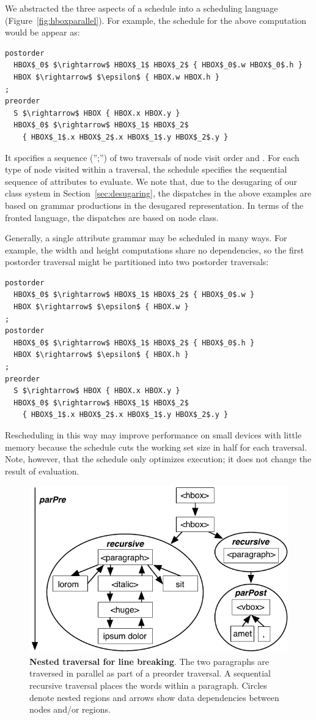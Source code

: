 We abstracted the three aspects of a schedule into a scheduling language (Figure~\ref{fig:hboxparallel}). For example, the schedule for the above computation would be appear as:
\begin{lstlisting}[mathescape,morekeywords={preorder,postorder}]
postorder
  HBOX$_0$ $\rightarrow$ HBOX$_1$ HBOX$_2$ { HBOX$_0$.w HBOX$_0$.h }
  HBOX $\rightarrow$ $\epsilon$ { HBOX.w HBOX.h }
;
preorder
  S $\rightarrow$ HBOX { HBOX.x HBOX.y }
  HBOX$_0$ $\rightarrow$ HBOX$_1$ HBOX$_2$ 
    { HBOX$_1$.x HBOX$_2$.x HBOX$_1$.y HBOX$_2$.y }
\end{lstlisting}
It specifies a sequence ('';'') of two traversals of node visit order  and . For each type of node visited within a traversal, the schedule specifies the sequential sequence of attributes to evaluate. We note that, due to the desugaring of our class system in Section~\ref{sec:desugaring}, the dispatches in the above examples are based on grammar productions in the desugared representation. In terms of the fronted language, the dispatches are based on node class.


Generally, a single attribute grammar may be scheduled in many ways. For example, the width and height computations share no dependencies, so the first postorder traversal might be partitioned into two postorder traversals:
\begin{lstlisting}[mathescape,morekeywords={preorder,postorder}]
postorder
  HBOX$_0$ $\rightarrow$ HBOX$_1$ HBOX$_2$ { HBOX$_0$.w }
  HBOX $\rightarrow$ $\epsilon$ { HBOX.w }
;
postorder
  HBOX$_0$ $\rightarrow$ HBOX$_1$ HBOX$_2$ { HBOX$_0$.h }
  HBOX $\rightarrow$ $\epsilon$ { HBOX.h }
;
preorder
  S $\rightarrow$ HBOX { HBOX.x HBOX.y }
  HBOX$_0$ $\rightarrow$ HBOX$_1$ HBOX$_2$ 
    { HBOX$_1$.x HBOX$_2$.x HBOX$_1$.y HBOX$_2$.y }
\end{lstlisting}
Rescheduling in this way may improve performance on small devices with little memory because the schedule cuts the working set size in half for each traversal. Note, however, that the schedule only optimizes execution; it does not change the result of evaluation.


\begin{figure}
\centering
\includegraphics[trim=0 0 0 0,clip,width=0.7\columnwidth]{chapter3/nested}
\caption{\textbf{Nested traversal for line breaking}. The two paragraphs are traversed in parallel as part of a preorder traversal. A sequential recursive traversal places the words within a paragraph. Circles denote nested regions and arrows show data dependencies between nodes and/or regions.}
\label{fig:nested}
\end{figure}

